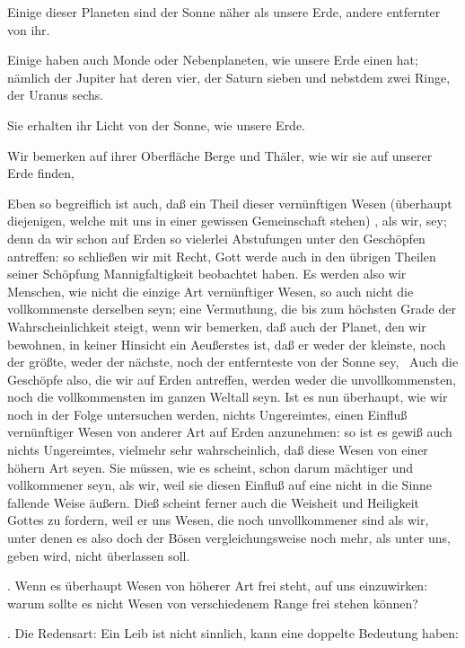 \begin{aufza}
\begin{aufzb}
\begin{aufzc}
\item Einige dieser Planeten sind der Sonne näher als unsere Erde, andere entfernter von ihr.
\item Einige haben auch Monde oder Nebenplaneten, wie unsere Erde einen hat; nämlich der Jupiter hat deren vier, der Saturn sieben und nebstdem zwei Ringe, der Uranus sechs.~
\item Sie erhalten ihr Licht von der Sonne, wie unsere Erde.
\item Wir bemerken auf ihrer Oberfläche Berge und Thäler, wie wir sie auf unserer Erde finden, \usw
\end{aufzc}
\item Eben so begreiflich ist auch, daß ein Theil dieser vernünftigen Wesen (überhaupt diejenigen, welche mit uns in einer gewissen Gemeinschaft stehen) , als wir, sey; denn da wir schon auf Erden so vielerlei Abstufungen unter den Geschöpfen antreffen: so schließen wir mit Recht, Gott werde auch in den übrigen Theilen seiner Schöpfung Mannigfaltigkeit beobachtet haben. Es werden also wir Menschen, wie nicht die einzige Art vernünftiger Wesen, so auch nicht die vollkommenste derselben seyn; eine Vermuthung, die bis zum höchsten Grade der Wahrscheinlichkeit steigt, wenn wir bemerken, daß auch der Planet, den wir bewohnen, in keiner Hinsicht ein Aeußerstes ist, daß er weder der kleinste, noch der größte, weder der nächste, noch der entfernteste von der Sonne sey, \usw\ Auch die Geschöpfe also, die wir auf Erden antreffen, werden weder die unvollkommensten, noch die vollkommensten im ganzen Weltall seyn. Ist es nun überhaupt, wie wir noch in der Folge untersuchen werden, nichts Ungereimtes, einen Einfluß vernünftiger Wesen von anderer Art auf Erden anzunehmen: so ist es gewiß auch nichts Ungereimtes, vielmehr sehr wahrscheinlich, daß diese Wesen von einer höhern Art seyen. Sie müssen, wie es scheint, schon darum mächtiger und vollkommener seyn, als wir, weil sie diesen Einfluß auf eine nicht in die Sinne fallende Weise äußern. Dieß scheint ferner auch die Weisheit und Heiligkeit Gottes zu fordern, weil er uns Wesen, die noch unvollkommener sind als wir, unter denen es also doch der Bösen vergleichungsweise noch mehr, als unter uns, geben wird, nicht überlassen soll.
\item {}. Wenn es überhaupt Wesen von höherer Art frei steht, auf uns einzuwirken: warum sollte es nicht Wesen von verschiedenem Range frei stehen können?~
\item {}. Die Redensart: Ein Leib ist nicht sinnlich, kann eine doppelte Bedeutung haben:

\end{aufzb}
\end{aufza}
